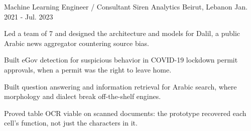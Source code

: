 \begin{cventries}
  \cventry
    {Machine Learning Engineer / Consultant} %
    {Siren Analytics} %
    {Beirut, Lebanon} %
    {Jan. 2021 - Jul. 2023} %
    {
      \begin{cvitems} %
        \item{Led a team of 7 and designed the architecture and models for Dalil, a public Arabic news aggregator countering source bias.}
        \item{Built eGov detection for suspicious behavior in \mbox{COVID-19} lockdown permit approvals, when a permit was the right to leave home.}
        \item{Built question answering and information retrieval for Arabic search, where morphology and dialect break \mbox{off-the-shelf} engines.}
        \item{Proved table OCR viable on scanned documents: the prototype recovered each cell's function, not just the characters in it.}
      \end{cvitems}
    }


\end{cventries}
